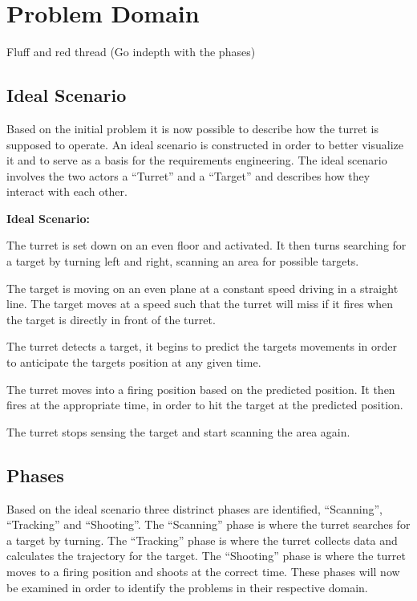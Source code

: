 \chapter{Problem Domain}
Fluff and red thread
(Go indepth with the phases)


\section{Ideal Scenario}
Based on the initial problem it is now possible to describe how the turret is
supposed to operate. An ideal scenario is constructed in order to better
visualize it and to serve as a basis for the requirements engineering. The
ideal scenario involves the two actors a ``Turret'' and a ``Target'' and
describes how they interact with each other.

\begin{center}
\colorbox{diff}{
\begin{minipage}{0.8\linewidth}
\textbf{Ideal Scenario:}

The turret is set down on an even floor and activated. It then turns searching
for a target by turning left and right, scanning an area for possible
targets.\nl

The target is moving on an even plane at a constant speed driving in a straight
line. The target moves at a speed such that the turret will miss if it fires
when the target is directly in front of the turret.\nl

The turret detects a target, it begins to predict the targets movements in
order to anticipate the targets position at any given time.\nl

The turret moves into a firing position based on the predicted position. It then
fires at the appropriate time, in order to hit the target at the predicted
position.\nl

The turret stops sensing the target and start scanning the area again.

\end{minipage}
}
\end{center}


\section{Phases}
Based on the ideal scenario three distrinct phases are identified,
``Scanning'', ``Tracking'' and ``Shooting''. The ``Scanning'' phase is where
the turret searches for a target by turning. The ``Tracking'' phase is where the
turret collects data and calculates the trajectory for the target. The
``Shooting'' phase is where the turret moves to a firing position and shoots at
the correct time. These phases will now be examined in order to identify the
problems in their respective domain.

